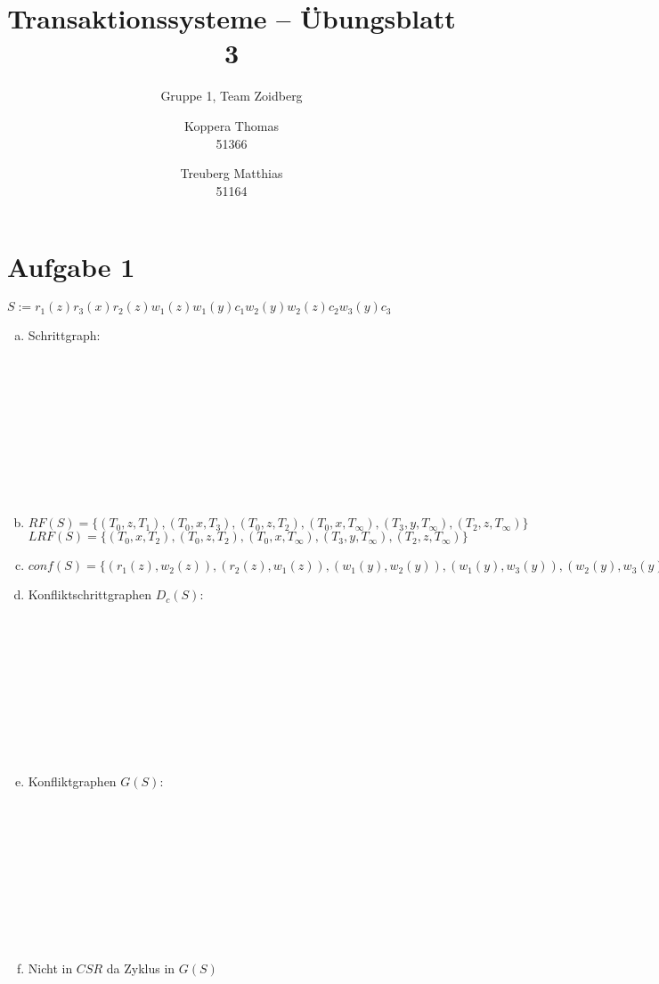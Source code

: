 \documentclass{scrartcl}
\title{Transaktionssysteme -- Übungsblatt 3}
\subtitle{Gruppe 1, Team Zoidberg}
\author{Koppera Thomas \\ 51366
 \and Treuberg Matthias \\ 51164}
\date{ }
\begin{document}
  \maketitle
  
\section*{Aufgabe 1}
$S := r_1(z)r_3(x)r_2(z)w_1(z)w_1(y)c_1w_2(y)w_2(z)c_2w_3(y)c_3$

\begin{enumerate}[a)]
\item 
Schrittgraph:\\\\\\\\\\\\\\\\\\\\
\item
$RF(S) =  \{(T_0,z,T_1), (T_0,x,T_3), (T_0,z,T_2), (T_0,x,T_\infty), (T_3,y,T_\infty), (T_2,z,T_\infty) \}$ \\
$LRF(S) =  \{(T_0,x,T_2), (T_0,z,T_2), (T_0,x,T_\infty), (T_3,y,T_\infty), (T_2,z,T_\infty) \}$

\item

$conf(S) = \{(r_1(z),w_2(z)), (r_2(z),w_1(z)), (w_1(y),w_2(y)), (w_1(y),w_3(y)), (w_2(y),w_3(y)) \}$

\item
Konfliktschrittgraphen $D_c(S)$:\\\\\\\\\\\\\\\\\\\\
\item
Konfliktgraphen $G(S)$:\\\\\\\\\\\\\\\\\\\\

\item
Nicht in $CSR$ da Zyklus in $G(S)$
\end{enumerate}
\end{document}
